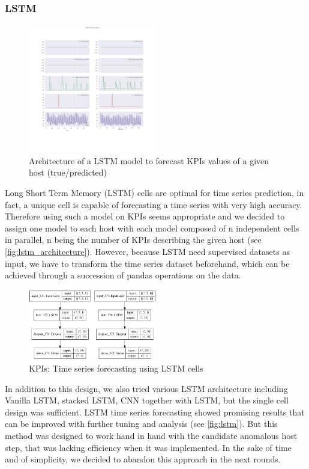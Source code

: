 \documentclass[acmsmall, screen, nonacm]{acmart}
\begin{document}
\subsubsection*{LSTM}
\begin{figure}[h!]
  \centering
  \includegraphics[width=0.5\textwidth]{images/lstm.png}
  \caption{Architecture of a LSTM model to forecast KPIs values of a given host (true/predicted)}
  \label{fig:lstm_architecture}
\end{figure}

Long Short Term Memory (LSTM) cells are optimal for time series prediction, in fact, a unique cell is capable of forecasting a time series with very high accuracy. 
Therefore using such a model on KPIs seems appropriate and we decided to assign one model to each host with each model composed of n independent cells in parallel, n being the number of KPIs describing the given host (see \autoref{fig:lstm_architecture}).
However, because LSTM need supervised datasets as input, we have to transform the time series dataset beforehand, which can be achieved through a succession of pandas operations on the data. 
\\
\begin{figure}[h!]
  \centering
  \includegraphics[width=0.5\textwidth]{images/lstm_model.png}
  \caption{KPIs: Time series forecasting using LSTM cells}
  \label{fig:lstm}
\end{figure}
In addition to this design, we also tried various LSTM architecture including Vanilla LSTM, stacked LSTM, CNN together with LSTM, but the single cell design was sufficient.
LSTM time series forecasting showed promising results that can be improved with further tuning and analysis (see \autoref{fig:lstm}). 
But this method was designed to work hand in hand with the candidate anomalous host step, that was lacking efficiency when it was implemented. 
In the sake of time and of simplicity, we decided to abandon this approach in the next rounds. 
\end{document}

